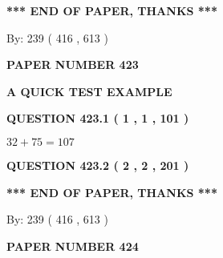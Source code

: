 \documentclass[12pt]{article}
\begin{document}
   
   
   
   
\vspace{1.0in} 
{\textbf{\large{ *** END OF PAPER, THANKS *** }}} 
   
   
\hspace{1.0in} By: 
 239 ( 416 ,  613 )
   
   
   
   
\newpage 
\setcounter{page}{ 
   423001 } 
   
   
   
   
 {\textbf{ \Large{ PAPER NUMBER  423  }}}
   
   
\vspace{0.2in}
   
   
   
   
   
   
 \vspace{0.2in}
{\LARGE {\textbf{ A QUICK TEST EXAMPLE}}}
   
   
  
\vspace{0.2in}
  
{\textbf{\Large{QUESTION
423.1 
 ( 1 , 1 , 101 )
}}}
  
  
 
 

$ %
32 +  %
75=   %
107$
 
 
  
\vspace{0.2in}
  
{\textbf{\Large{QUESTION
423.2 
 ( 2 , 2 , 201 )
}}}
  
  
   
   
 \vspace{0.2in}
 
   
   
   
   
\vspace{1.0in} 
{\textbf{\large{ *** END OF PAPER, THANKS *** }}} 
   
   
\hspace{1.0in} By: 
 239 ( 416 ,  613 )
   
   
   
   
\newpage 
\setcounter{page}{ 
   424001 } 
   
   
   
   
 {\textbf{ \Large{ PAPER NUMBER  424  }}}
   
\end{document}
